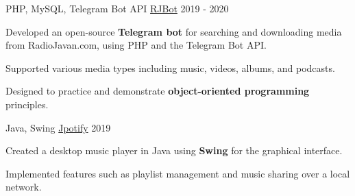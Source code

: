 \begin{cventries}
  \cventry
    {PHP, MySQL, Telegram Bot API} %
    {\href{https://github.com/radinshayanfar/RJBot}{RJBot}} %
    {} %
    {2019 - 2020} %
    {
      \begin{cvitems} %
          \item {Developed an open-source \textbf{Telegram bot} for searching and downloading media from RadioJavan.com, using PHP and the Telegram Bot API.}
          \item {Supported various media types including music, videos, albums, and podcasts.}
          \item {Designed to practice and demonstrate \textbf{object-oriented programming} principles.}
      \end{cvitems}
    }


  \cventry
    {Java, Swing} %
    {\href{https://github.com/radinshayanfar/Jpotify}{Jpotify}} %
    {} %
    {2019} %
    {
      \begin{cvitems} %
          \item {Created a desktop music player in Java using \textbf{Swing} for the graphical interface.}
          \item {Implemented features such as playlist management and music sharing over a local network.}
      \end{cvitems}
    }



\end{cventries}
